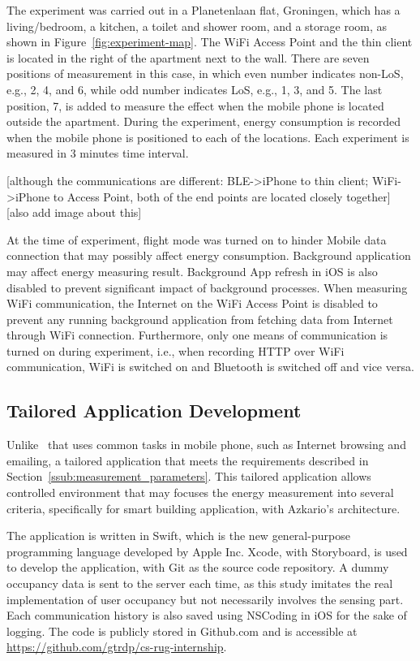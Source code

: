 \documentclass[journal]{vgtc}                %
\begin{document}
The experiment was carried out in a Planetenlaan flat, Groningen, which has a living/bedroom, a kitchen, a toilet and shower room, and a storage room, as shown in Figure~\ref{fig:experiment-map}. The WiFi Access Point and the thin client is located in the right of the apartment next to the wall. There are seven positions of measurement in this case, in which even number indicates non-LoS, e.g., 2, 4, and 6, while odd number indicates LoS, e.g., 1, 3, and 5. The last position, 7, is added to measure the effect when the mobile phone is located outside the apartment. During the experiment, energy consumption is recorded when the mobile phone is positioned to each of the locations. Each experiment is measured in 3 minutes time interval.

[although the communications are different: BLE->iPhone to thin client; WiFi->iPhone to Access Point, both of the end points are located closely together]
[also add image about this]

At the time of experiment, flight mode was turned on to hinder Mobile data connection that may possibly affect energy consumption.  Background application may affect energy measuring result. Background App refresh in iOS is also disabled to prevent significant impact of background processes. When measuring WiFi communication, the Internet on the WiFi Access Point is disabled to prevent any running background application from fetching data from Internet through WiFi connection. Furthermore, only one means of communication is turned on during experiment, i.e., when recording HTTP over WiFi communication, WiFi is switched on and Bluetooth is switched off and vice versa.


\subsection{Tailored Application Development} %
\label{sub:tailored_application_development}
Unlike~\cite{Balasubramanian2009} that uses common tasks in mobile phone, such as Internet browsing and emailing, a tailored application that meets the requirements described in Section~\ref{ssub:measurement_parameters}. This tailored application allows controlled environment that may focuses the energy measurement into several criteria, specifically for smart building application, with Azkario's architecture.

The application is written in Swift, which is the new general-purpose programming language developed by Apple Inc. Xcode, with Storyboard, is used to develop the application, with Git as the source code repository. A dummy occupancy data is sent to the server each time, as this study imitates the real implementation of user occupancy but not necessarily involves the sensing part. Each communication history is also saved using NSCoding in iOS for the sake of logging. The code is publicly stored in Github.com and is accessible at \url{https://github.com/gtrdp/cs-rug-internship}.
\end{document}
